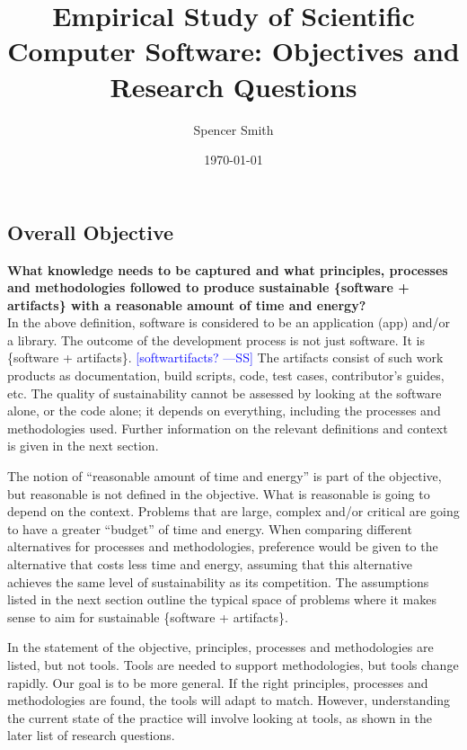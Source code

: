 \documentclass[12pt]{article}
\newcommand{\authornote}[3]{\textcolor{#1}{[#3 ---#2]}}
\newcommand{\authornote}[3]{}
\newcommand{\wss}[1]{\authornote{blue}{SS}{#1}} %
\begin{document}
\title{Empirical Study of Scientific Computer Software: Objectives and Research Questions} 
\author{Spencer Smith}
\date{\today}
	

\subsection* {Overall Objective}

\textbf{What knowledge needs to be captured and what principles, processes and
  methodologies followed to produce sustainable \{software + artifacts\} with
  a reasonable amount of time and energy?}\\

In the above definition, software is considered to be an application (app)
and/or a library.  The outcome of the development process is not just software.
It is \{software + artifacts\}.  \wss{softwartifacts?} The artifacts consist of
such work products as documentation, build scripts, code, test cases,
contributor's guides, etc.  The quality of sustainability cannot be assessed by
looking at the software alone, or the code alone; it depends on everything,
including the processes and methodologies used.  Further information on the
relevant definitions and context is given in the next section.

The notion of ``reasonable amount of time and energy'' is part of the objective,
but reasonable is not defined in the objective.  What is reasonable is going to
depend on the context.  Problems that are large, complex and/or critical are
going to have a greater ``budget'' of time and energy.  When comparing different
alternatives for processes and methodologies, preference would be given to the
alternative that costs less time and energy, assuming that this alternative
achieves the same level of sustainability as its competition.  The assumptions
listed in the next section outline the typical space of problems where it makes
sense to aim for sustainable \{software + artifacts\}.

In the statement of the objective, principles, processes and methodologies are
listed, but not tools.  Tools are needed to support methodologies, but tools
change rapidly.  Our goal is to be more general.  If the right principles,
processes and methodologies are found, the tools will adapt to match.  However,
understanding the current state of the practice will involve looking at tools,
as shown in the later list of research questions.
\end{document}
